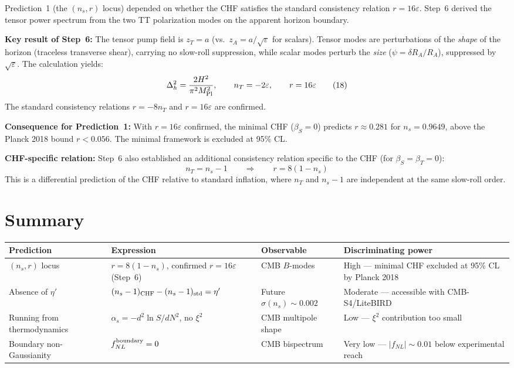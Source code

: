 \documentclass[12pt,a4paper]{article}
\begin{document}
Prediction~1 (the $(n_s, r)$ locus) depended on whether the CHF satisfies the standard consistency relation $r = 16\varepsilon$. Step~6 derived the tensor power spectrum from the two TT polarization modes on the apparent horizon boundary.

\textbf{Key result of Step~6:} The tensor pump field is $z_T = a$ (vs.\ $z_A = a/\sqrt{\varepsilon}$ for scalars). Tensor modes are perturbations of the \textit{shape} of the horizon (traceless transverse shear), carrying no slow-roll suppression, while scalar modes perturb the \textit{size} ($\psi = \delta R_A/R_A$), suppressed by $\sqrt\varepsilon$. The calculation yields:
\begin{equation}
\Delta_h^2 = \frac{2H^2}{\pi^2 M_{\rm Pl}^2}, \qquad n_T = -2\varepsilon, \qquad r = 16\varepsilon \tag{18}
\end{equation}
The standard consistency relations $r = -8n_T$ and $r = 16\varepsilon$ are confirmed.

\textbf{Consequence for Prediction~1:} With $r = 16\varepsilon$ confirmed, the minimal CHF ($\beta_S = 0$) predicts $r \approx 0.281$ for $n_s = 0.9649$, above the Planck 2018 bound $r < 0.056$. The minimal framework is excluded at 95\% CL.

\textbf{CHF-specific relation:} Step~6 also established an additional consistency relation specific to the CHF (for $\beta_S = \beta_T = 0$):
\begin{equation}
n_T = n_s - 1 \qquad \Longrightarrow \qquad r = 8(1 - n_s) \tag{19}
\end{equation}
This is a differential prediction of the CHF relative to standard inflation, where $n_T$ and $n_s - 1$ are independent at the same slow-roll order.

\section{Summary}

\begin{table}[h]
\centering
\small
\begin{tabular}{@{}lp{3.5cm}p{2.5cm}p{4cm}@{}}
\toprule
Prediction & Expression & Observable & Discriminating power \\
\midrule
$(n_s, r)$ locus & $r = 8(1-n_s)$, confirmed $r=16\varepsilon$ (Step~6) & CMB $B$-modes & High --- minimal CHF excluded at 95\% CL by Planck 2018 \\[4pt]
Absence of $\eta'$ & $(n_s - 1)_{\rm CHF} - (n_s-1)_{\rm std} = \eta'$ & Future $\sigma(n_s) \sim 0.002$ & Moderate --- accessible with CMB-S4/LiteBIRD \\[4pt]
Running from thermodynamics & $\alpha_s = -d^2\ln S/dN^2$, no $\xi^2$ & CMB multipole shape & Low --- $\xi^2$ contribution too small \\[4pt]
Boundary non-Gaussianity & $f_{NL}^{\rm boundary} = 0$ & CMB bispectrum & Very low --- $|f_{NL}| \sim 0.01$ below experimental reach \\
\bottomrule
\end{tabular}
\end{table}
\end{document}
